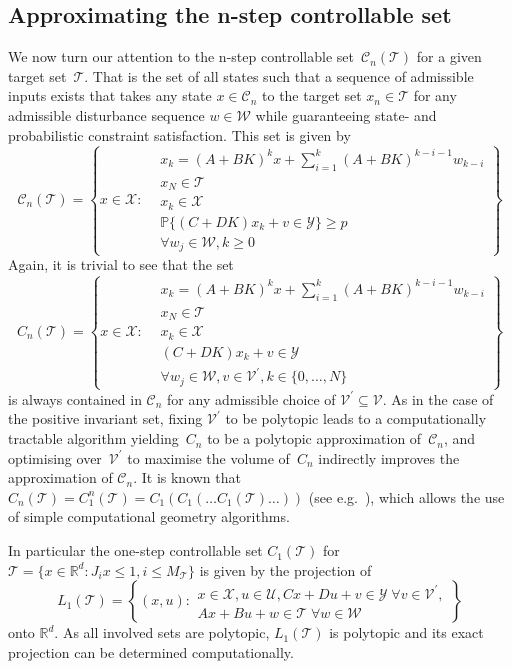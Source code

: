 \documentclass{ifacconf}
\providecommand{\C}{\mathcal C}
\providecommand{\W}{\mathcal W}
\providecommand{\V}{\mathcal V}
\providecommand{\X}{\mathcal X}
\providecommand{\Y}{\mathcal Y}
\providecommand{\U}{\mathcal U}
\providecommand{\T}{\mathcal T}
\providecommand{\PP}{\mathbb P}
\providecommand{\RR}{\mathbb R}
\begin{document}
\subsection{Approximating the n-step controllable set}\label{ssec:approximating:n:step}
%
We now turn our attention to the n-step controllable set~$\C_n(\T)$ for a given target set~$\T$.
%
That is the set of all states such that a sequence of admissible inputs exists that takes any state $x\in\C_n$ to the target set $x_n\in\T$ for any admissible disturbance sequence $w\in\W$ while guaranteeing state- and probabilistic constraint satisfaction.
%
This set is given by
%
\begin{equation}
	\C_n(\T) = \left\{x\in\X:\begin{aligned}&x_k = (A+BK)^k x + \sum_{i=1}^{k} (A+BK)^{k-i-1} w_{k-i}\\
	&x_N\in\T\\
	&x_k\in\X\\
	&\PP\{(C+DK)x_k+v\in\Y\}\geq p\\
	&\forall w_j\in\W,k\geq 0\end{aligned} \right\}	
\end{equation}
%
Again, it is trivial to see that the set
%
\begin{equation}
	C_n(\T) = \left\{x\in\X:\begin{aligned}&x_k = (A+BK)^k x + \sum_{i=1}^{k} (A+BK)^{k-i-1} w_{k-i}\\
	&x_N\in\T\\
	&x_k\in\X\\
	&(C+DK)x_k+v\in\Y\\
	&\forall w_j\in\W,v\in \V^\prime,k\in\{0,\dots,N\}\end{aligned} \right\}	
\end{equation}
%
is always contained in $\C_n$ for any admissible choice of $\V^\prime\subseteq\V$.
%
As in the case of the positive invariant set, fixing $\V^\prime$ to be polytopic leads to a computationally tractable algorithm yielding~$C_n$ to be a polytopic approximation of~$\C_n$, and optimising over~$\V^\prime$ to maximise the volume of~$C_n$ indirectly improves the approximation of $\C_n$.
%
It is known that $C_n(\T) = C^n_1(\T) = C_1(C_1(\dots C_1(\T)\dots))$ (see e.g.~\cite{blanchini:2007}), which allows the use of simple computational geometry algorithms.

In particular the one-step controllable set $C_1(\T)$ for $\T = \{x\in\RR^d:J_i x\leq1,i\leq M_\T\}$ is given by the projection of 
%
\begin{equation}
	L_1(\T) = \left\{(x,u):\begin{aligned}
	x\in\X, u\in\U, Cx+Du + v\in\Y\;\forall v\in\V^\prime,\\
	Ax+Bu+w\in\T\;\forall w\in\W
	\end{aligned}\right\}
\end{equation}
%
onto $\RR^d$.
%
As all involved sets are polytopic, $L_1(\T)$ is polytopic and its exact projection can be determined computationally.
\end{document}
